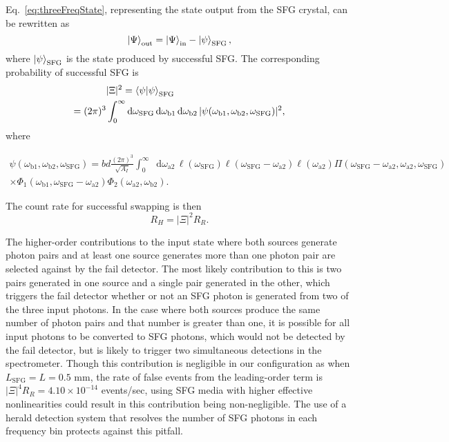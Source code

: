 \documentclass[twocolumn,amssymb, nobibnotes, showpacs, aps, pra,10pt]{revtex4-1}
\newcommand*{\watwo}{\omega_{\textrm{a}2}}
\newcommand*{\wbone}{\omega_{\textrm{b}1}}
\newcommand*{\wbtwo}{\omega_{\textrm{b}2}}
\newcommand*{\wsfg}{\omega_\textrm{SFG}}
\newcommand*\diff{\mathop{}\!\mathrm{d}}
\begin{document}
Eq.\ \eqref{eq:threeFreqState}, representing the state output from the SFG crystal, can be rewritten as 
\begin{equation} \label{eq:threeFreqStateShort}
\ket{\Psi}_\text{out}= \ket{\Psi}_\text{in}-\ket{\psi}_{\text{SFG}},
\end{equation}
where $\ket{\psi}_{\text{SFG}}$ is the state produced by successful SFG. The corresponding probability of successful SFG is 
\begin{align} 
&|\Xi|^2 = \braket{\psi | \psi}_{\text{SFG}} \nonumber \\
= (2 \pi)^3 & \int_0^\infty \diff \wsfg \diff \wbone \diff \wbtwo \, |\psi (\wbone,\wbtwo,\wsfg)|^2, \label{eq:Psfg}
\end{align}
where
\begin{widetext}
\begin{equation} \label{eq:psiFull}
\begin{split}
\psi(\wbone,\wbtwo,\wsfg) = b d \frac{(2 \pi)^3}{\sqrt{A_I}}\int_0^\infty \diff \watwo \, \ell(\wsfg) \ell(\wsfg - \watwo) \ell(\watwo) \Pi(\wsfg-\watwo, \watwo, \wsfg)\\ \times \Phi_1(\wbone,\wsfg-\watwo) \Phi_2(\watwo,\wbtwo).
\end{split}
\end{equation}
\end{widetext}
The count rate for successful swapping is then
\begin{equation} \label{eq:swapRate}
R_H = |\Xi|^2 R_R.
\end{equation}

The higher-order contributions to the input state where both sources generate photon pairs and at least one source generates more than one photon pair are selected against by the fail detector. The most likely contribution to this is two pairs generated in one source and a single pair generated in the other, which triggers the fail detector whether or not an SFG photon is generated from two of the three input photons. In the case where both sources produce the same number of photon pairs and that number is greater than one, it is  possible for all input photons to be converted to SFG photons, which would not be detected by the fail detector, but is likely to trigger two simultaneous detections in the spectrometer. Though this contribution is negligible in our configuration as when $L_{\text{SFG}} = L = 0.5$ mm, the rate of false events from the leading-order term is $|\Xi|^4 R_R = 4.10 \times 10^{-14}$ events/sec, using SFG media with higher effective nonlinearities could result in this contribution being non-negligible. The use of a herald detection system that resolves the number of SFG photons in each frequency bin protects against this pitfall.
\end{document}
